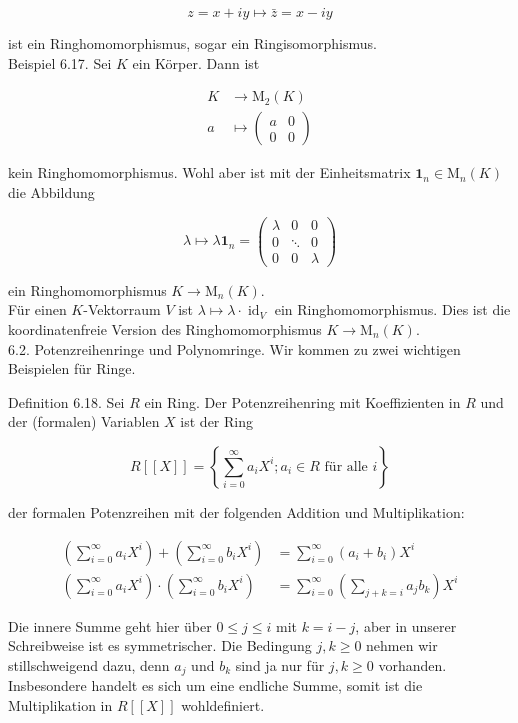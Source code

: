 \documentclass[10pt, letterpaper]{article}
\begin{document}
$$
z=x+i y \mapsto \bar{z}=x-i y
$$

ist ein Ringhomomorphismus, sogar ein Ringisomorphismus.\\
Beispiel 6.17. Sei $K$ ein Körper. Dann ist

$$
\begin{aligned}
K & \rightarrow \mathrm{M}_{2}(K) \\
a & \mapsto\left(\begin{array}{ll}
a & 0 \\
0 & 0
\end{array}\right)
\end{aligned}
$$

kein Ringhomomorphismus. Wohl aber ist mit der Einheitsmatrix $\mathbf{1}_{n} \in \mathrm{M}_{n}(K)$ die Abbildung

$$
\lambda \mapsto \lambda \mathbf{1}_{n}=\left(\begin{array}{ccc}
\lambda & 0 & 0 \\
0 & \ddots & 0 \\
0 & 0 & \lambda
\end{array}\right)
$$

ein Ringhomomorphismus $K \rightarrow \mathrm{M}_{n}(K)$.\\
Für einen $K$-Vektorraum $V$ ist $\lambda \mapsto \lambda \cdot \operatorname{id}_{V}$ ein Ringhomomorphismus. Dies ist die koordinatenfreie Version des Ringhomomorphismus $K \rightarrow \mathrm{M}_{n}(K)$.\\
6.2. Potenzreihenringe und Polynomringe. Wir kommen zu zwei wichtigen Beispielen für Ringe.

Definition 6.18. Sei $R$ ein Ring. Der Potenzreihenring mit Koeffizienten in $R$ und der (formalen) Variablen $X$ ist der Ring

$$
R[[X]]=\left\{\sum_{i=0}^{\infty} a_{i} X^{i} ; a_{i} \in R \text { für alle } i\right\}
$$

der formalen Potenzreihen mit der folgenden Addition und Multiplikation:

$$
\begin{aligned}
\left(\sum_{i=0}^{\infty} a_{i} X^{i}\right)+\left(\sum_{i=0}^{\infty} b_{i} X^{i}\right) & =\sum_{i=0}^{\infty}\left(a_{i}+b_{i}\right) X^{i} \\
\left(\sum_{i=0}^{\infty} a_{i} X^{i}\right) \cdot\left(\sum_{i=0}^{\infty} b_{i} X^{i}\right) & =\sum_{i=0}^{\infty}\left(\sum_{j+k=i} a_{j} b_{k}\right) X^{i}
\end{aligned}
$$

Die innere Summe geht hier über $0 \leq j \leq i$ mit $k=i-j$, aber in unserer Schreibweise ist es symmetrischer. Die Bedingung $j, k \geq 0$ nehmen wir stillschweigend dazu, denn $a_{j}$ und $b_{k}$ sind ja nur für $j, k \geq 0$ vorhanden. Insbesondere handelt es sich um eine endliche Summe, somit ist die Multiplikation in $R[[X]]$ wohldefiniert.
\end{document}

